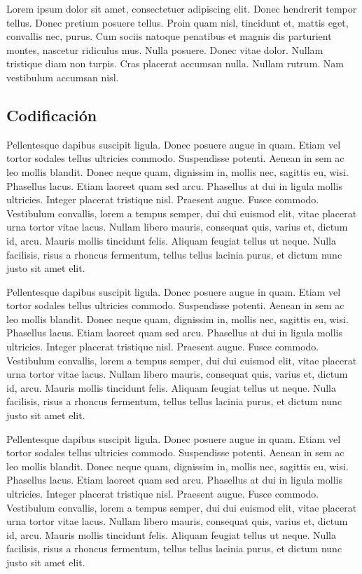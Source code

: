 Lorem ipsum dolor sit amet, consectetuer adipiscing elit.  Donec
hendrerit tempor tellus.  Donec pretium posuere tellus.  Proin quam
nisl, tincidunt et, mattis eget, convallis nec, purus.  Cum sociis
natoque penatibus et magnis dis parturient montes, nascetur ridiculus
mus.  Nulla posuere.  Donec vitae dolor.  Nullam tristique diam non
turpis.  Cras placerat accumsan nulla.  Nullam rutrum.  Nam vestibulum
accumsan nisl.

\subsection{Codificación}

Pellentesque dapibus suscipit ligula.  Donec posuere augue in quam.
Etiam vel tortor sodales tellus ultricies commodo.  Suspendisse
potenti.  Aenean in sem ac leo mollis blandit.  Donec neque quam,
dignissim in, mollis nec, sagittis eu, wisi.  Phasellus lacus.  Etiam
laoreet quam sed arcu.  Phasellus at dui in ligula mollis ultricies.
Integer placerat tristique nisl.  Praesent augue.  Fusce commodo.
Vestibulum convallis, lorem a tempus semper, dui dui euismod elit,
vitae placerat urna tortor vitae lacus.  Nullam libero mauris,
consequat quis, varius et, dictum id, arcu.  Mauris mollis tincidunt
felis.  Aliquam feugiat tellus ut neque.  Nulla facilisis, risus a
rhoncus fermentum, tellus tellus lacinia purus, et dictum nunc justo
sit amet elit.


Pellentesque dapibus suscipit ligula.  Donec posuere augue in quam.
Etiam vel tortor sodales tellus ultricies commodo.  Suspendisse
potenti.  Aenean in sem ac leo mollis blandit.  Donec neque quam,
dignissim in, mollis nec, sagittis eu, wisi.  Phasellus lacus.  Etiam
laoreet quam sed arcu.  Phasellus at dui in ligula mollis ultricies.
Integer placerat tristique nisl.  Praesent augue.  Fusce commodo.
Vestibulum convallis, lorem a tempus semper, dui dui euismod elit,
vitae placerat urna tortor vitae lacus.  Nullam libero mauris,
consequat quis, varius et, dictum id, arcu.  Mauris mollis tincidunt
felis.  Aliquam feugiat tellus ut neque.  Nulla facilisis, risus a
rhoncus fermentum, tellus tellus lacinia purus, et dictum nunc justo
sit amet elit.

Pellentesque dapibus suscipit ligula.  Donec posuere augue in quam.
Etiam vel tortor sodales tellus ultricies commodo.  Suspendisse
potenti.  Aenean in sem ac leo mollis blandit.  Donec neque quam,
dignissim in, mollis nec, sagittis eu, wisi.  Phasellus lacus.  Etiam
laoreet quam sed arcu.  Phasellus at dui in ligula mollis ultricies.
Integer placerat tristique nisl.  Praesent augue.  Fusce commodo.
Vestibulum convallis, lorem a tempus semper, dui dui euismod elit,
vitae placerat urna tortor vitae lacus.  Nullam libero mauris,
consequat quis, varius et, dictum id, arcu.  Mauris mollis tincidunt
felis.  Aliquam feugiat tellus ut neque.  Nulla facilisis, risus a
rhoncus fermentum, tellus tellus lacinia purus, et dictum nunc justo
sit amet elit.


